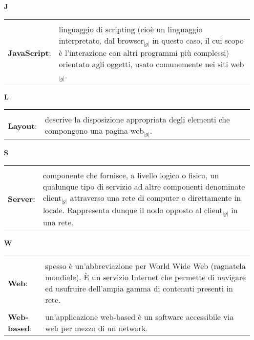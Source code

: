 \hfill\Huge{\textbf{J}}\\	
\normalsize
	\begin{longtable}{p{} p{}} 
	    \toprule
	    \\	
  \textbf{JavaScript}:	&	linguaggio di scripting (cioè un linguaggio interpretato, dal browser$_{|g|}$ in questo caso, il cui scopo è l’interazione con altri programmi più complessi) orientato agli oggetti, usato comunemente nei siti web$_{|g|}$.\\	
\end{longtable}	
	
	\hfill\Huge{\textbf{L}}\\	
\normalsize
	\begin{longtable}{p{} p{}} 
	    \toprule
	    \\
		    \textbf{Layout}:		&	descrive la disposizione appropriata degli elementi che compongono una pagina web$_{|g|}$.\\
	\end{longtable}	
	
	\hfill\Huge{\textbf{S}}\\	
\normalsize
	\begin{longtable}{p{} p{}} 
	    \toprule
	    \\
	    \textbf{Server}:			&	componente che fornisce, a livello logico o fisico, un qualunque tipo di servizio ad altre componenti denominate client$_{|g|}$ attraverso una rete di computer o direttamente in locale. Rappresenta 
							dunque il nodo opposto al client$_{|g|}$ in una rete.\\
	\end{longtable}	
	\hfill\Huge{\textbf{W}}\\	
\normalsize
	\begin{longtable}{p{} p{}} 
	    \toprule
	    \\
	    	    \textbf{Web}:&	spesso è un’abbreviazione per World Wide Web (ragnatela mondiale). \`E un servizio Internet che permette di navigare ed usufruire dell’ampia gamma di contenuti presenti in rete.\\
	    \\
	\textbf{Web-based}: & 	
	un'applicazione web-based è un software accessibile via web per mezzo di un network.
	\end{longtable}

